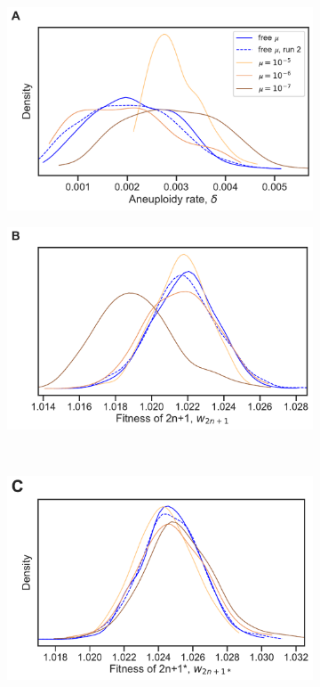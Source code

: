 \documentclass[12pt]{extarticle}
\begin{document}
  
\begin{figure}[h!]
  \centering
  \begin{subfigure}{0.45\textwidth}
      \includegraphics[width=\textwidth]{../figures/mu-A.pdf}      
  \end{subfigure}
  \begin{subfigure}{0.45\textwidth}
      \includegraphics[width=\textwidth]{../figures/mu-B.pdf}      
  \end{subfigure}
  \\
   \begin{subfigure}{0.45\textwidth}
      \includegraphics[width=\textwidth]{../figures/mu-C.pdf}      

\end{subfigure}
\end{figure}
\end{document}
